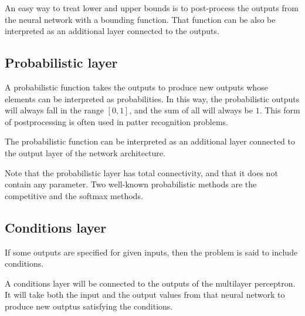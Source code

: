 An easy way to treat lower and upper bounds is to post-process the outputs from the neural network with a bounding function.
That function can be also be interpreted as an additional layer connected to the outputs. 



\subsection*{Probabilistic layer}

A probabilistic function takes the outputs to produce new outputs whose elements can be interpreted as probabilities. 
In this way, the probabilistic outputs will always fall in the range $[0,1]$, and the sum of all will always be $1$. This form of postprocessing is often used in patter recognition problems.

The probabilistic function can be interpreted as an additional layer connected to the output layer of the network architecture.


Note that the probabilistic layer has total connectivity, and that it does not contain any parameter. 
Two well-known probabilistic methods are the competitive and the softmax methods. 

\subsection*{Conditions layer}

If some outputs are specified for given inputs, then the problem is
said to include conditions. 

A conditions layer will be connected to the outputs of the multilayer perceptron. It will take both the input and the output values from that neural network to produce new outptus satisfying the conditions. 

